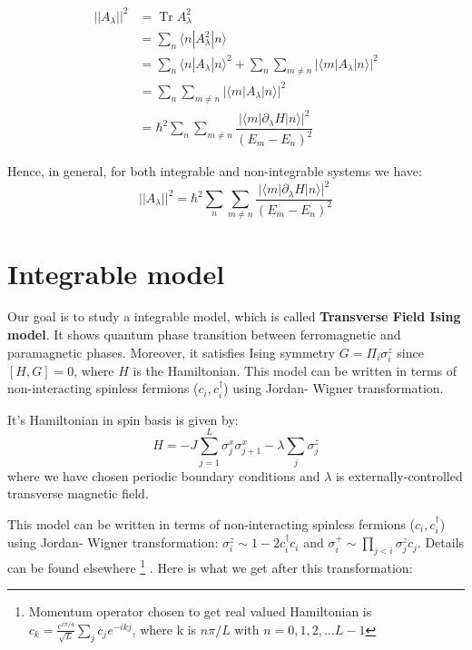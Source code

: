 \documentclass[11pt,a4paper]{article}
\DeclareMathOperator{\Tr}{Tr}
\begin{document}
\begin{align}
||A_{\lambda}||^2 &= \Tr  A_{\lambda}^2 \\
&= \sum_n \langle n | A^2_{\lambda}| n \rangle \\
&= \sum_{n} \langle n | A_{\lambda}| n \rangle ^2 + \sum_n \sum_{m \neq n}  |\langle m | A_{\lambda}| n \rangle|^2 \\
&=  \sum_n \sum_{m \neq n}  |\langle m | A_{\lambda}| n \rangle|^2 \\
&= \hbar^2 \sum_n \sum_{m \neq n}  \dfrac{|\langle m | \partial_{\lambda}H| n \rangle|^2}{(E_m-E_n)^2} 
\end{align}

Hence, in general, for both integrable and non-integrable systems we have: 
\begin{equation}
\boxed{||A_{\lambda}||^2 = \hbar^2\sum_n \sum_{m \neq n}  \dfrac{|\langle m | \partial_{\lambda}H| n \rangle|^2}{(E_m-E_n)^2} }
\end{equation}


\section{Integrable model}
Our goal is to study a integrable model, which is called \textbf{Transverse Field Ising model}. It shows quantum phase transition between ferromagnetic and paramagnetic phases. Moreover, it satisfies Ising symmetry $G= \Pi_i \sigma_i^z$ since $[H, G]=0$, where $H$ is the Hamiltonian.
This model can be written in terms of non-interacting spinless fermions ($c_i, c^{\dagger}_i $) using Jordan- Wigner transformation. 

It's Hamiltonian in spin basis is given by:
\begin{equation}
H= -J \sum_{j=1}^{L} \sigma_j^x \sigma_{j+1}^x - \lambda \sum_{j} \sigma_j^z 
\label{xx_z}
\end{equation}
where we have chosen periodic boundary conditions and $\lambda$ is externally-controlled transverse magnetic field.

This model can be written in terms of non-interacting spinless fermions ($c_i, c^{\dagger}_i $) using Jordan- Wigner transformation: $\sigma_i^z \sim 1 - 2 c^{\dagger}_i c_i   $ and $\sigma_i^+ \sim \prod_{j<i} \sigma_j^z c_j   $. Details can be found elsewhere \cite{sachdev2007quantum} \footnote{Momentum operator chosen to get real valued Hamiltonian is $c_k= \frac{e^{i \pi/4}}{\sqrt{L}}\sum_j c_j e^{-ikj}$, where k is $n\pi/L$ with $n=0,1,2, \ldots L-1$} . Here is what we get after this transformation:
\end{document}
